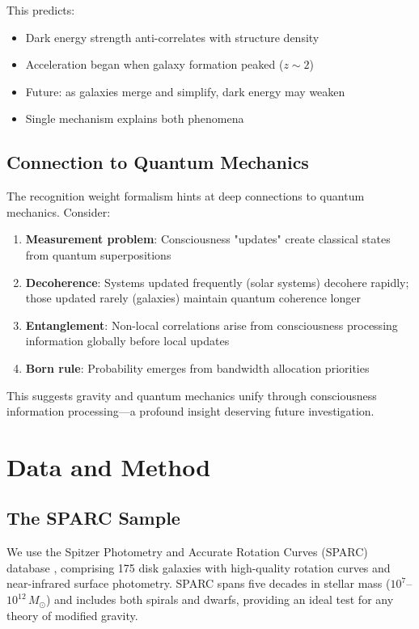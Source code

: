 \documentclass[twocolumn,prd,amsmath,amssymb,aps,superscriptaddress,nofootinbib]{revtex4-2}
\newcommand{\Msun}{M_{\odot}}
\begin{document}
This predicts:
\begin{itemize}
\item Dark energy strength anti-correlates with structure density
\item Acceleration began when galaxy formation peaked ($z \sim 2$)
\item Future: as galaxies merge and simplify, dark energy may weaken
\item Single mechanism explains both phenomena
\end{itemize}

\subsection{Connection to Quantum Mechanics}

The recognition weight formalism hints at deep connections to quantum mechanics. Consider:

\begin{enumerate}
\item \textbf{Measurement problem}: Consciousness "updates" create classical states from quantum superpositions
\item \textbf{Decoherence}: Systems updated frequently (solar systems) decohere rapidly; those updated rarely (galaxies) maintain quantum coherence longer
\item \textbf{Entanglement}: Non-local correlations arise from consciousness processing information globally before local updates
\item \textbf{Born rule}: Probability emerges from bandwidth allocation priorities
\end{enumerate}

This suggests gravity and quantum mechanics unify through consciousness information processing---a profound insight deserving future investigation.

\section{Data and Method}
\label{sec:data}

\subsection{The SPARC Sample}

We use the Spitzer Photometry and Accurate Rotation Curves (SPARC) database \cite{Lelli2016}, comprising 175 disk galaxies with high-quality rotation curves and near-infrared surface photometry. SPARC spans five decades in stellar mass ($10^7$--$10^{12}\,\Msun$) and includes both spirals and dwarfs, providing an ideal test for any theory of modified gravity.
\end{document}
